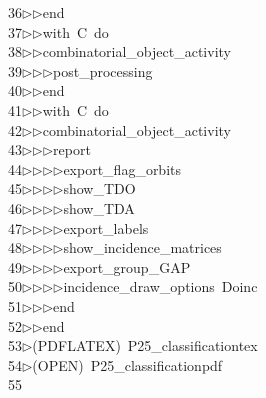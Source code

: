 \begin{tabbing}
36\>$\triangleright$\>$\triangleright$\>end\ \\[0pt]
37\>$\triangleright$\>$\triangleright$\>with\ C\ do\ \\[0pt]
38\>$\triangleright$\>$\triangleright$\>combinatorial\_object\_activity\ \\[0pt]
39\>$\triangleright$\>$\triangleright$\>$\triangleright$\>post\_processing\ \\[0pt]
40\>$\triangleright$\>$\triangleright$\>end\ \\[0pt]
41\>$\triangleright$\>$\triangleright$\>with\ C\ do\ \\[0pt]
42\>$\triangleright$\>$\triangleright$\>combinatorial\_object\_activity\ \\[0pt]
43\>$\triangleright$\>$\triangleright$\>$\triangleright$\>report\ \\[0pt]
44\>$\triangleright$\>$\triangleright$\>$\triangleright$\>$\triangleright$\>export\_flag\_orbits\ \\[0pt]
45\>$\triangleright$\>$\triangleright$\>$\triangleright$\>$\triangleright$\>show\_TDO\ \\[0pt]
46\>$\triangleright$\>$\triangleright$\>$\triangleright$\>$\triangleright$\>show\_TDA\ \\[0pt]
47\>$\triangleright$\>$\triangleright$\>$\triangleright$\>$\triangleright$\>export\_labels\ \\[0pt]
48\>$\triangleright$\>$\triangleright$\>$\triangleright$\>$\triangleright$\>show\_incidence\_matrices\ \\[0pt]
49\>$\triangleright$\>$\triangleright$\>$\triangleright$\>$\triangleright$\>export\_group\_GAP\ \\[0pt]
50\>$\triangleright$\>$\triangleright$\>$\triangleright$\>$\triangleright$\>incidence\_draw\_options\ Doinc\ \\[0pt]
51\>$\triangleright$\>$\triangleright$\>$\triangleright$\>end\ \\[0pt]
52\>$\triangleright$\>$\triangleright$\>end\\[0pt]
53\>$\triangleright$\>(PDFLATEX)\ P25\_classificationtex\\[0pt]
54\>$\triangleright$\>(OPEN)\ P25\_classificationpdf\\[0pt]
55\>\end{tabbing}

